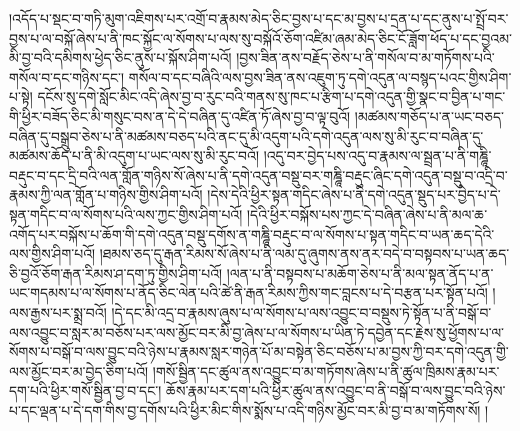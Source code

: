 །འདོད་པ་སྡང་བ་གཏི་མུག་འཇིགས་པར་འགྲོ་བ་རྣམས་མེད་ཅིང་བྱས་པ་དང་མ་བྱས་པ་དྲན་པ་དང་ནུས་པ་སྤྲོ་བར་བྱས་པ་ལ་བསྐོ་ཞེས་པ་ནི་ཁང་སྐྱོང་ལ་སོགས་པ་ལས་སུ་བསྐོའོ་ཅོག་འཛིམ་ཞམ་མེད་ཅིང་ངོ་ཟློག་ཕོད་པ་དང་བྱའམ་མི་བྱ་བའི་དམིགས་ཕྱེད་ཅིང་ནུས་པ་སྐོས་ཤིག་པའོ། །བྱས་ཟིན་ནས་བརྗོད་ཅེས་པ་ནི་གསོལ་བ་མ་གཏོགས་པའི་གསོལ་བ་དང་གཉིས་དང་། གསོལ་བ་དང་བཞིའི་ལས་བྱས་ཟིན་ནས་འཇུག་ཏུ་དགེ་འདུན་ལ་བསྙད་པའང་གྱིས་ཤིག་པ་སྟེ། དངོས་སུ་དགེ་སློང་མིང་འདི་ཞེས་བྱ་བ་རུང་བའི་གནས་སུ་ཁང་པ་རྩིག་པ་དགེ་འདུན་གྱི་སྣང་བ་བྱིན་པ་གང་གི་ཕྱིར་བཟོད་ཅིང་མི་གསུང་བས་ན་དེ་དེ་བཞིན་དུ་འཛིན་ཏོ་ཞེས་བྱ་བ་ལྟ་བུའོ། །མཚམས་གཅོད་པ་ན་ཡང་བཅད་བཞིན་དུ་བསྒྲུབ་ཅེས་པ་ནི་མཚམས་བཅད་པའི་ནང་དུ་མི་འདུག་པའི་དགེ་འདུན་ལས་སུ་མི་རུང་བ་བཞིན་དུ་མཚམས་ཆོད་པ་ནི་མི་འདུག་པ་ཡང་ལས་སུ་མི་རུང་བའོ། །འདུ་བར་བྱེད་པས་འདུ་བ་རྣམས་ལ་སྦྲན་པ་ནི་གཎྜཱི་བརྡུང་བ་དང་དྲི་བའི་ལན་གློན་གཉིས་སོ་ཞེས་པ་ནི་དགེ་འདུན་བསྡུ་བར་གཎྜཱི་བརྡུང་ཞིང་དགེ་འདུན་བསྡུ་བ་འདྲི་བ་རྣམས་ཀྱི་ལན་གློན་པ་གཉིས་གྱིས་ཤིག་པའོ། །དེས་དེའི་ཕྱིར་སྟན་གདིང་ཞེས་པ་ནི་དགེ་འདུན་སྡུད་པར་བྱེད་པ་དེ་སྟན་གདིང་བ་ལ་སོགས་པའི་ལས་ཀྱང་གྱིས་ཤིག་པའོ། །དེའི་ཕྱིར་བསྐོས་པས་ཀྱང་དེ་བཞིན་ཞེས་པ་ནི་མལ་ཆ་འགོད་པར་བསྐོས་པ་ཆོག་གི་དགེ་འདུན་བསྡུ་དགོས་ན་གཎྜཱི་བརྡུང་བ་ལ་སོགས་པ་སྟན་གདིང་བ་ཡན་ཆད་དེའི་ལས་གྱིས་ཤིག་པའོ། །ཐམས་ཅད་དུ་རྒན་རིམས་སོ་ཞེས་པ་ནི་ལམ་དུ་ཞུགས་ནས་ནར་བདེ་བ་བསྟབས་པ་ཡན་ཆད་ཅི་བྱའོ་ཅོག་རྒན་རིམས་ཤ་དག་ཏུ་གྱིས་ཤིག་པའོ། །ལན་པ་ནི་བསྟབས་པ་མཆོག་ཅེས་པ་ནི་མལ་སྟན་ནོད་པ་ན་ཡང་གདམས་པ་ལ་སོགས་པ་ནོད་ཅིང་ལེན་པའི་ཚེ་ནི་རྒན་རིམས་ཀྱིས་གང་བླངས་པ་དེ་བརྩན་པར་སྟོན་པའོ། །ལས་རྒྱས་པར་སྨྲ་བའོ། །དེ་དང་མི་འདྲ་བ་རྣམས་ཞུས་པ་ལ་སོགས་པ་ལས་འབྱུང་བ་བསྡུས་ཏེ་སྟོན་པ་ནི་བསྒོ་བ་ལས་འབྱུང་བ་སླར་མ་བཅོས་པར་ལས་མྱོང་བར་མི་བྱ་ཞེས་པ་ལ་སོགས་པ་ཡིན་ཏེ་དབྱེན་དང་རྗེས་སུ་ཕྱོགས་པ་ལ་སོགས་པ་བསྒོ་བ་ལས་བྱུང་བའི་ཉེས་པ་རྣམས་སླར་གཉེན་པོ་མ་བསྟེན་ཅིང་བཅོས་པ་མ་བྱས་ཀྱི་བར་དགེ་འདུན་གྱི་ལས་མྱོང་བར་མ་བྱེད་ཅིག་པའོ། །གསོ་སྦྱིན་དང་ཚུལ་ནས་འབྱུང་བ་མ་གཏོགས་ཞེས་པ་ནི་ཚུལ་ཁྲིམས་རྣམ་པར་དག་པའི་ཕྱིར་གསོ་སྦྱིན་བྱ་བ་དང་། ཆོས་རྣམ་པར་དག་པའི་ཕྱིར་ཚུལ་ནས་འབྱུང་བ་ནི་བསྒོ་བ་ལས་བྱུང་བའི་ཉེས་པ་དང་ལྡན་པ་དེ་དག་གིས་བྱ་དགོས་པའི་ཕྱིར་མིང་གིས་སྨོས་པ་འདི་གཉིས་མྱོང་བར་མི་བྱ་བ་མ་གཏོགས་སོ། །
